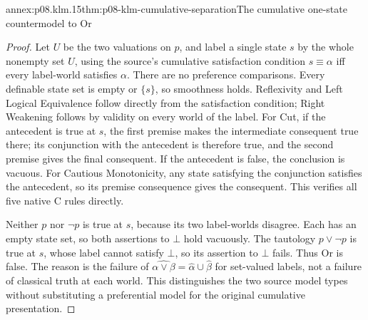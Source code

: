 \begin{annexitem}{annex:p08.klm.15}{thm:p08-klm-cumulative-separation}{The cumulative one-state countermodel to Or}
\begin{proof}
Let \(U\) be the two valuations on \(p\), and label a single state
\(s\) by the whole nonempty set \(U\), using the source's cumulative
satisfaction condition \(s\equiv\alpha\) iff every label-world
satisfies \(\alpha\). There are no preference comparisons. Every
definable state set is empty or \(\{s\}\), so smoothness holds.
Reflexivity and Left Logical Equivalence follow directly from the
satisfaction condition; Right Weakening follows by validity on every
world of the label. For Cut, if the antecedent is true at \(s\),
the first premise makes the intermediate consequent true there; its
conjunction with the antecedent is therefore true, and the second
premise gives the final consequent. If the antecedent is false, the
conclusion is vacuous. For Cautious Monotonicity, any state satisfying
the conjunction satisfies the antecedent, so its premise consequence
gives the consequent. This verifies all five native C rules directly.

Neither \(p\) nor \(\neg p\) is true at \(s\), because its two
label-worlds disagree. Each has an empty state set, so both assertions
to \(\bot\) hold vacuously. The tautology \(p\vee\neg p\) is
true at \(s\), whose label cannot satisfy \(\bot\), so its
assertion to \(\bot\) fails. Thus Or is false.
The reason is the failure of
\(\widehat{\alpha\vee\beta}=\widehat\alpha\cup\widehat\beta\)
for set-valued labels, not a failure of classical truth at each world.
This distinguishes the two source model types without substituting
a preferential model for the original cumulative presentation.
\end{proof}
\end{annexitem}
